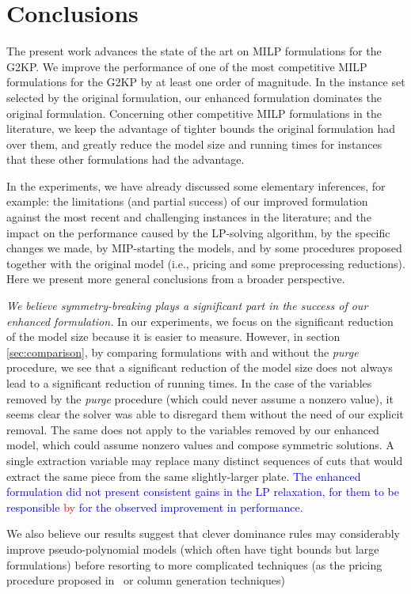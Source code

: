 \documentclass[ppgc,tese,english,formais,babel]{iiufrgs}
\newif\iffinalversion
\newcommand{\newtext}[1]{\iffinalversion%
#1%
\else%
\textcolor{blue}{#1}%
\fi%
}
\newcommand{\oldtext}[1]{\iffinalversion%
\else%
\textcolor{red}{#1}%
\fi%
}
\begin{document}
\chapter{Conclusions}
\label{sec:conclusions}

The present work advances the state of the art on MILP formulations for the G2KP.
We improve the performance of one of the most competitive MILP formulations for the G2KP by at least one order of magnitude.
In the instance set selected by the original formulation, our enhanced formulation dominates the original formulation.
Concerning other competitive MILP formulations in the literature, we keep the advantage of tighter bounds the original formulation had over them, and greatly reduce the model size and running times for instances that these other formulations had the advantage.

In the experiments, we have already discussed some elementary inferences, for example: the limitations (and partial success) of our improved formulation against the most recent and challenging instances in the literature; and the impact on the performance caused by the LP-solving algorithm, by the specific changes we made, by MIP-starting the models, and by some procedures proposed together with the original model (i.e., pricing and some preprocessing reductions).
Here we present more general conclusions from a broader perspective.

\emph{We believe symmetry-breaking plays a significant part in the success of our enhanced formulation.}
In our experiments, we focus on the significant reduction of the model size because it is easier to measure.
However, in section \cref{sec:comparison}, by comparing formulations with and without the \emph{purge} procedure, we see that a significant reduction of the model size does not always lead to a significant reduction of running times.
In the case of the variables removed by the \emph{purge} procedure (which could never assume a nonzero value), it seems clear the solver was able to disregard them without the need of our explicit removal.
The same does not apply to the variables removed by our enhanced model, which could assume nonzero values and compose symmetric solutions.
A single extraction variable may replace many distinct sequences of cuts that would extract the same piece from the same slightly-larger plate.
\newtext{The enhanced formulation did not present consistent gains in the LP relaxation, for them to be responsible \oldtext{by}\newtext{for} the observed improvement in performance.}
We also believe our results suggest that clever dominance rules may considerably improve pseudo-polynomial models (which often have tight bounds but large formulations) before resorting to more complicated techniques (as the pricing procedure proposed in~\citet{furini:2016} or column generation techniques)
\end{document}
